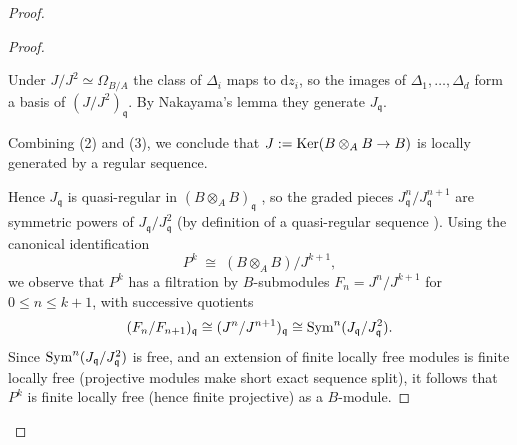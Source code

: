 \begin{proof}
\begin{proof}
\begin{enumerate}
                  Under $J/J^2\simeq \Omega_{B/A}$ the class of $\Delta_i$ maps to $\mathrm{d}z_i$,
                  so the images of $\Delta_1,\dots,\Delta_d$ form a basis of $(J/J^2)_{\mathfrak q}$.
                  By Nakayama's lemma they generate $J_{\mathfrak q}$.

        \end{enumerate}

        Combining (2) and (3), we conclude that $J:=\operatorname{Ker}(B\otimes_A B\to B)$ is locally generated by a regular sequence.

        \medskip

        Hence $J_{\mathfrak q}$ is quasi-regular in $(B\otimes_A B)_{\mathfrak q}$ \cite[\href{https://stacks.math.columbia.edu/tag/00LN}{Tag 00LN}]{stacks-project}, so the graded pieces $J_{\mathfrak{q}}^n/J_{\mathfrak{q}}^{n+1}$ are symmetric
        powers of $J_{\mathfrak{q}}/J_{\mathfrak{q}}^2$ (by definition of a quasi-regular sequence \cite[\href{https://stacks.math.columbia.edu/tag/061P}{Tag 061P}]{stacks-project}). Using the canonical identification \cite[\href{https://stacks.math.columbia.edu/tag/0H90}{Tag 0H90}]{stacks-project}
        \[
            P^k \;\cong\; (B\otimes_A B)/J^{k+1},
        \]
        we observe that $P^k$ has a filtration by $B$-submodules $F_n = J^n/J^{k+1}$ for $0 \le n \le k+1$, with successive quotients
        \[
            (F_n/F_{n+1})_{\mathfrak q} \cong (J^n/J^{n+1})_{\mathfrak q} \cong \operatorname{Sym}^n(J_{\mathfrak{q}}/J_{\mathfrak{q}}^2).
        \]
        Since $\operatorname{Sym}^n(J_{\mathfrak{q}}/J_{\mathfrak{q}}^2)$ is free, and an extension of finite locally free modules is finite locally free (projective \cite[\href{https://stacks.math.columbia.edu/tag/00NX}{Tag 00NX}]{stacks-project} modules make short exact sequence split), it follows that $P^k$ is finite locally free (hence finite projective) as a $B$-module.


\end{proof}
\end{proof}
